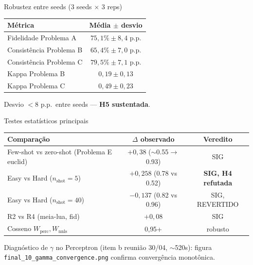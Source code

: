 \documentclass[aspectratio=169,10pt]{beamer}
\begin{document}
\begin{frame}{Robustez entre seeds (3 seeds $\times$ 3 reps)}
  \scriptsize
  \begin{center}
  \begin{tabular}{lc}
    \toprule
    M\'etrica & M\'edia $\pm$ desvio \\
    \midrule
    Fidelidade Problema A        & $75{,}1\% \pm 8{,}4$ p.p. \\
    Consist\^encia Problema B    & $65{,}4\% \pm 7{,}0$ p.p. \\
    Consist\^encia Problema C    & $79{,}5\% \pm 7{,}1$ p.p. \\
    Kappa Problema B             & $0{,}19 \pm 0{,}13$ \\
    Kappa Problema C             & $0{,}49 \pm 0{,}23$ \\
    \bottomrule
  \end{tabular}
  \end{center}
  \medskip
  Desvio $< 8$ p.p.\ entre seeds --- \textbf{H5 sustentada}.
\end{frame}

\begin{frame}{Testes estat\'isticos principais}
  \scriptsize
  \begin{center}
  \begin{tabular}{lcc}
    \toprule
    Compara\c{c}\~ao & $\Delta$ observado & Veredito \\
    \midrule
    Few-shot vs zero-shot (Problema E euclid) & $+0{,}38$ ($\sim$0.55$\to$0.93) & SIG \\
    Easy vs Hard ($n_{\text{shot}}=5$)    & $+0{,}258$ (0.78 vs 0.52)      & \textbf{SIG, H4 refutada} \\
    Easy vs Hard ($n_{\text{shot}}=40$)   & $-0{,}137$ (0.82 vs 0.96)      & SIG, REVERTIDO \\
    R2 vs R4 (meia-lua, fid)               & $+0{,}08$                       & SIG \\
    Cosseno $W_{\text{perc}}, W_{\text{nnls}}$ & 0{,}95+                  & robusto \\
    \bottomrule
  \end{tabular}
  \end{center}
  \medskip
  Diagn\'ostico de $\gamma$ no Perceptron (item b reuni\~ao 30/04, $\sim$520s): figura \texttt{final\_10\_gamma\_convergence.png} confirma converg\^encia monot\^onica.
\end{frame}
\end{document}
